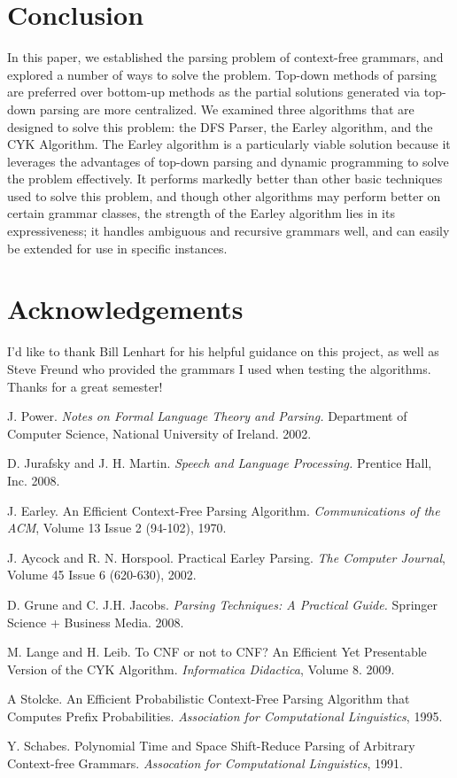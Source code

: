 \documentclass[a4paper, 11pt]{article}
\begin{document}
\section{Conclusion}
In this paper, we established the parsing problem of context-free grammars, and explored a number of ways to solve the problem. Top-down methods of parsing are preferred 
over bottom-up methods as the partial solutions generated via top-down parsing are more centralized. We examined three algorithms that are designed to solve this problem:
the DFS Parser, the Earley algorithm, and the CYK Algorithm. The Earley algorithm is a particularly viable
solution because it leverages the advantages of top-down parsing and dynamic programming to solve the problem effectively. It performs markedly better than other
 basic techniques used to solve this problem, and though other algorithms may perform better on certain grammar classes, the strength of the Earley algorithm 
lies in its expressiveness; it handles ambiguous and recursive grammars well, and can easily be extended for use in specific instances. 

\section{Acknowledgements}
I'd like to thank Bill Lenhart for his helpful guidance on this project, as well as Steve Freund who provided the grammars I used when testing the algorithms. Thanks for a 
great semester!

\begin{thebibliography}{9}

  J. Power.
  \emph{Notes on Formal Language Theory and Parsing.}
  Department of Computer Science, National University of Ireland.
  2002.

  D. Jurafsky and J. H. Martin.
  \emph{Speech and Language Processing.}
  Prentice Hall, Inc. 2008.

  J. Earley. 
  An Efficient Context-Free Parsing Algorithm.
  \emph{Communications of the ACM}, Volume 13 Issue 2 (94-102),
  1970.
  
  J. Aycock and R. N. Horspool.
  Practical Earley Parsing.
  \emph{The Computer Journal}, Volume 45 Issue 6 (620-630),
  2002.

  D. Grune and C. J.H. Jacobs. 
  \emph{Parsing Techniques: A Practical Guide.}
  Springer Science + Business Media. 2008.

  M. Lange and H. Leib. To CNF or not to CNF? An Efficient Yet Presentable
  Version of the CYK Algorithm.
  \emph{Informatica Didactica}, Volume 8. 2009.

  A Stolcke. An Efficient Probabilistic Context-Free Parsing Algorithm
  that Computes Prefix Probabilities. 
  \emph{Association for Computational Linguistics}, 1995.

  Y. Schabes. Polynomial Time and Space Shift-Reduce Parsing of Arbitrary
  Context-free Grammars. 
  \emph{Assocation for Computational Linguistics}, 1991.

\end{thebibliography}
\end{document}
